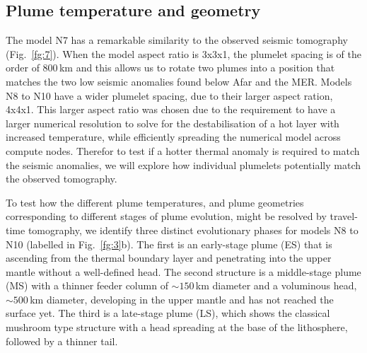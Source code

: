 \documentclass[a4paper,10pt,twocolumn]{paper}
\begin{document}
\subsection{Plume temperature and geometry}

The model N7 has a remarkable similarity to the observed seismic tomography (Fig.~\ref{fg:7}). When the model aspect ratio is 3x3x1, the plumelet spacing is of the order of 800\,km and this allows us to rotate two plumes into a position that matches the two low seismic anomalies found below Afar and the MER. Models N8 to N10 have a wider plumelet spacing, due to their larger aspect ration, 4x4x1. This larger aspect ratio was chosen due to the requirement to have a larger numerical resolution to solve for the destabilisation of a hot layer with increased temperature, while efficiently spreading the numerical model across compute nodes. Therefor to test if a hotter thermal anomaly is required to match the seismic anomalies, we will explore how individual plumelets potentially match the observed tomography.

To test how the different plume temperatures, and plume geometries corresponding to different stages of plume evolution, might be resolved by travel-time tomography, we identify three distinct evolutionary phases for models N8 to N10 (labelled in Fig.~\ref{fg:3}b). The first is an early-stage plume (ES) that is ascending from the thermal boundary layer and penetrating into the upper mantle without a well-defined head. The second structure is a middle-stage plume (MS) with a thinner feeder column of $\sim 150$\,km diameter and a voluminous head, $\sim 500$\,km diameter, developing in the upper mantle and has not reached the surface yet. The third is a late-stage plume (LS), which shows the classical mushroom type structure with a head spreading at the base of the lithosphere, followed by a thinner tail.
\end{document}
